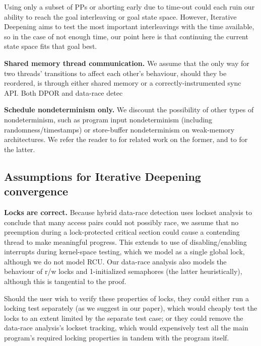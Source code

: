 \documentclass[pldi]{sigplanconf-pldi15}
\begin{document}
Using only a subset of PPs or aborting early due to time-out could each ruin our ability to reach the goal interleaving or goal state space.
However, Iterative Deepening aims to test the most important interleavings with the time available,
so in the case of not enough time, our point here is that continuing the current state space fits that goal best.


{\bf Shared memory thread communication.}
We assume that the only way for two threads' transitions to affect each other's behaviour, should they be reordered,
is through either shared memory or a correctly-instrumented sync API. Both DPOR and data-race detec

{\bf Schedule nondeterminism only.}
We discount the possibility of other types of nondeterminism,
such as program input nondeterminism (including randomness/timestamps) or
store-buffer nondeterminism on weak-memory architectures.
We refer the reader to \cite{klee,portend} for related work on the former, and to \cite{tsopso} for the latter.

\subsection{Assumptions for Iterative Deepening convergence}

{\bf Locks are correct.}
Because hybrid data-race detection uses lockset analysis to conclude that many access pairs could not possibly race,
we assume that no preemption during a lock-protected critical section could cause a contending thread to make meaningful progress.
This extends to use of disabling/enabling interrupts during kernel-space testing, which we model as a single global lock,
although we do not model RCU.
Our data-race analysis also models the behaviour of r/w locks and 1-initialized semaphores (the latter heuristically), although this is tangential to the proof.

Should the user wish to verify these properties of locks,
they could either run a locking test separately (as we suggest in our paper),
which would cheaply test the locks to an extent limited by the separate test case;
or they could remove the data-race analysis's lockset tracking,
which would expensively test all the main program's required locking properties in tandem with the program itself.
\end{document}
